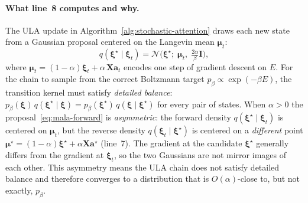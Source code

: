 \paragraph{What line~8 computes and why.}
The ULA update in Algorithm~\ref{alg:stochastic-attention} draws each new state from a Gaussian proposal centered on the Langevin mean $\boldsymbol{\mu}_t$:
\begin{equation}\label{eq:mala-forward}
q(\boldsymbol{\xi}^{\star}\mid\boldsymbol{\xi}_t)
= \mathcal{N}\!\bigl(\boldsymbol{\xi}^{\star};\;\boldsymbol{\mu}_t,\;\tfrac{2\alpha}{\beta}\mathbf{I}\bigr),
\end{equation}
where $\boldsymbol{\mu}_t = (1{-}\alpha)\boldsymbol{\xi}_t + \alpha\,\mathbf{X}\mathbf{a}_t$ encodes one step of gradient descent on $E$.
For the chain to sample from the correct Boltzmann target $p_\beta\propto\exp(-\beta E)$, the transition kernel must satisfy \emph{detailed balance}: $p_\beta(\boldsymbol{\xi})\,q(\boldsymbol{\xi}^{\star}\mid\boldsymbol{\xi}) = p_\beta(\boldsymbol{\xi}^{\star})\,q(\boldsymbol{\xi}\mid\boldsymbol{\xi}^{\star})$ for every pair of states.
When $\alpha>0$ the proposal~\eqref{eq:mala-forward} is \emph{asymmetric}: the forward density $q(\boldsymbol{\xi}^{\star}\mid\boldsymbol{\xi}_t)$ is centered on $\boldsymbol{\mu}_t$, but the reverse density $q(\boldsymbol{\xi}_t\mid\boldsymbol{\xi}^{\star})$ is centered on a \emph{different} point $\boldsymbol{\mu}^{\star}=(1{-}\alpha)\boldsymbol{\xi}^{\star}+\alpha\mathbf{X}\mathbf{a}^{\star}$ (line~7). The gradient at the candidate $\boldsymbol{\xi}^{\star}$ generally differs from the gradient at $\boldsymbol{\xi}_t$, so the two Gaussians are not mirror images of each other. This asymmetry means the ULA chain does not satisfy detailed balance and therefore converges to a distribution that is $O(\alpha)$-close to, but not exactly, $p_\beta$.

